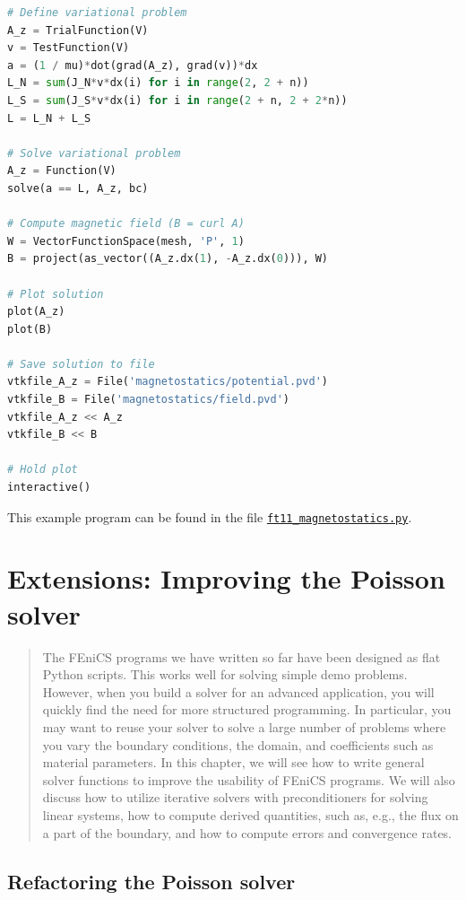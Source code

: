 \documentclass[graybox,envcountchap,sectrefs,final]{svmonodo}
\begin{document}
\begin{lstlisting}[language=Python,style=graycolor]
# Define variational problem
A_z = TrialFunction(V)
v = TestFunction(V)
a = (1 / mu)*dot(grad(A_z), grad(v))*dx
L_N = sum(J_N*v*dx(i) for i in range(2, 2 + n))
L_S = sum(J_S*v*dx(i) for i in range(2 + n, 2 + 2*n))
L = L_N + L_S

# Solve variational problem
A_z = Function(V)
solve(a == L, A_z, bc)

# Compute magnetic field (B = curl A)
W = VectorFunctionSpace(mesh, 'P', 1)
B = project(as_vector((A_z.dx(1), -A_z.dx(0))), W)

# Plot solution
plot(A_z)
plot(B)

# Save solution to file
vtkfile_A_z = File('magnetostatics/potential.pvd')
vtkfile_B = File('magnetostatics/field.pvd')
vtkfile_A_z << A_z
vtkfile_B << B

# Hold plot
interactive()
\end{lstlisting}
This example program can be found in the file \href{{https://fenicsproject.org/pub/tutorial/python/vol1/ft11_magnetostatics.py}}{\nolinkurl{ft11_magnetostatics.py}}.


\chapter{Extensions: Improving the Poisson solver}
\label{ch:poisson}


\begin{quote}
The FEniCS programs we have written so far have been designed as flat
Python scripts. This works well for solving simple demo
problems. However, when you build a solver for an advanced
application, you will quickly find the need for more structured
programming. In particular, you may want to reuse your solver to solve
a large number of problems where you vary the boundary conditions, the
domain, and coefficients such as material parameters. In this chapter,
we will see how to write general solver functions to improve the
usability of FEniCS programs. We will also discuss how to
utilize iterative solvers with preconditioners for solving linear
systems, how to compute derived quantities, such as, e.g., the flux
on a part of the boundary, and how to compute errors and convergence
rates.
\end{quote}


\section{Refactoring the Poisson solver}
\label{ch:poisson0:impl2}
\end{document}
